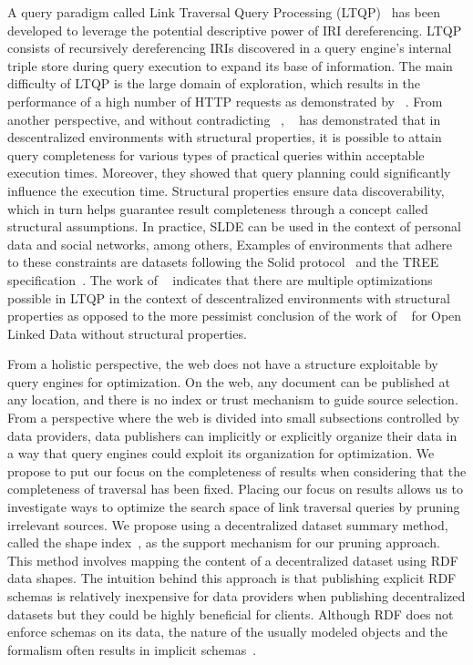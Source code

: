 A query paradigm called Link Traversal Query Processing (LTQP)~\cite{Hartig2012} has been developed to leverage the potential descriptive power of IRI dereferencing.
LTQP consists of recursively dereferencing IRIs discovered in a query engine's internal triple store during query execution to expand its base of information.
The main difficulty of LTQP is the large domain of exploration, which results in the performance of a high number of HTTP requests as demonstrated by \citeauthor{hartig2016walking}~\cite{hartig2016walking}.
From another perspective, and without contradicting \citeauthor{hartig2016walking}~\cite{hartig2016walking}, \citeauthor{Taelman2023}~\cite{Taelman2023} has demonstrated that in descentralized environments with structural properties,
it is possible to attain query completeness for various types of practical queries within acceptable execution times.
Moreover, they showed that query planning could significantly influence the execution time.
Structural properties ensure data discoverability, which in turn helps guarantee result completeness through a concept called structural assumptions.
In practice, SLDE can be used in the context of personal data and social networks, among others,
Examples of environments that adhere to these constraints are datasets following the Solid protocol~\cite{Taelman2023} and the TREE specification~\cite{tam_iswc_traversalsensortree_2024}.
The work of \citeauthor{Taelman2023}~\cite{Taelman2023} indicates that there are multiple optimizations possible in LTQP in the context of descentralized environments with structural properties as opposed to the
more pessimist conclusion of the work of \citeauthor{hartig2016walking}~\cite{hartig2016walking} for Open Linked Data without structural properties.

From a holistic perspective, the web does not have a structure exploitable by query engines for optimization.
On the web, any document can be published at any location, and there is no index or trust mechanism to guide source selection.
From a perspective where the web is divided into small subsections controlled by data providers, data publishers can implicitly or explicitly organize their data  
in a way that query engines could exploit its organization for optimization.
We propose to put our focus on the completeness of results when considering that the completeness of traversal has been fixed.
Placing our focus on results allows us to investigate ways to optimize the search space of link traversal queries by pruning irrelevant sources.
We propose using a decentralized dataset summary method, called the shape index~\cite{tam2024opportunitiesshapebasedoptimizationlink}, as the support mechanism for our pruning approach.
This method involves mapping the content of a decentralized dataset using RDF data shapes.
The intuition behind this approach is that publishing explicit RDF schemas is relatively inexpensive for data providers when publishing decentralized datasets but they could be highly beneficial for clients.
Although RDF does not enforce schemas on its data, the nature of the usually modeled objects and the formalism often results in implicit schemas~\cite{Neumann2011CharacteristicSA}.

